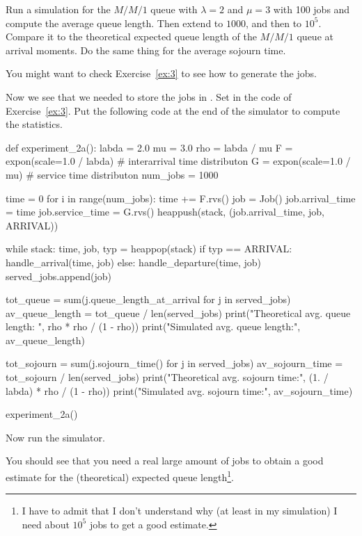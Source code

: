 \begin{exercise}
  Run a simulation for the $M/M/1$ queue with $\lambda=2$ and $\mu=3$ with 100 jobs and compute the average queue length. Then extend to $1000$, and then to $10^5$. Compare it to the theoretical expected queue length of the $M/M/1$ queue at arrival moments. Do the same thing for the average sojourn time.

\begin{hint}
You might want to check Exercise~\ref{ex:3} to see how to generate the jobs.
\end{hint}
\begin{solution}
    Now we see that we needed to store the jobs in . Set
in the code of Exercise~\ref{ex:3}. Put the following code at the end of the simulator to compute the statistics.
    \begin{pyverbatim}
def experiment_2a():
    labda = 2.0
    mu = 3.0
    rho = labda / mu
    F = expon(scale=1.0 / labda)  # interarrival time distributon
    G = expon(scale=1.0 / mu)  # service time distributon
    num_jobs = 1000

    time = 0
    for i in range(num_jobs):
        time += F.rvs()
        job = Job()
        job.arrival_time = time
        job.service_time = G.rvs()
        heappush(stack, (job.arrival_time, job, ARRIVAL))

    while stack:
        time, job, typ = heappop(stack)
        if typ == ARRIVAL:
            handle_arrival(time, job)
        else:
            handle_departure(time, job)
            served_jobs.append(job)

    tot_queue = sum(j.queue_length_at_arrival for j in served_jobs)
    av_queue_length = tot_queue / len(served_jobs)
    print("Theoretical avg. queue length: ", rho * rho / (1 - rho))
    print("Simulated avg. queue length:", av_queue_length)

    tot_sojourn = sum(j.sojourn_time() for j in served_jobs)
    av_sojourn_time = tot_sojourn / len(served_jobs)
    print("Theoretical avg. sojourn time:", (1. / labda) * rho / (1 - rho))
    print("Simulated avg. sojourn time:", av_sojourn_time)


experiment_2a()
  \end{pyverbatim}

Now run the simulator.

You should see that you need a real large amount of jobs to obtain a good estimate for the (theoretical) expected queue length\footnote{I have to admit that I don't understand why (at least in my simulation) I need about $10^5$ jobs to get a good estimate.}.

  \end{solution}
\end{exercise}

